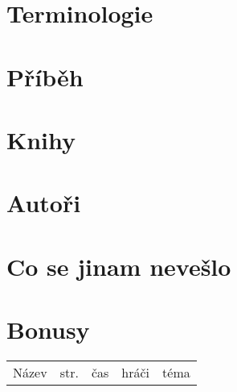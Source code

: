 \documentclass[a4paper,10pt,openany]{book}
\begin{document}
\chapter{Terminologie}\label{terminologie}
\label{:kategorie:terminologie}


\chapter{Příběh}



\chapter{Knihy}\label{knihy}



\chapter{Autoři}\label{autori}


\chapter{Co se jinam nevešlo}\label{co se jinam nevešlo}


\chapter{Bonusy}
\pagebreak
\newcommand{\btbinfo}[6]{

\ifx Z#6 \textbf{#1} \else #1 \small{  (i)} \fi   & \pageref{#2} &  \small{#3} & \small{#4} & \small{#5}\hline
}
\thispagestyle{empty} 
\begin{longtable}{|p{4cm}|p{.4cm}|p{3.2cm}|p{3cm}|p{4.2cm}|}
\hline 
Název&str.&čas&hráči&téma \hline 


\end{longtable}
\thispagestyle{empty} 
\pagebreak
\thispagestyle{empty} 
\renewcommand{\btbinfo}[6]{
\ifx Z#6 \large{#1}   \fi

} 
\end{document}
